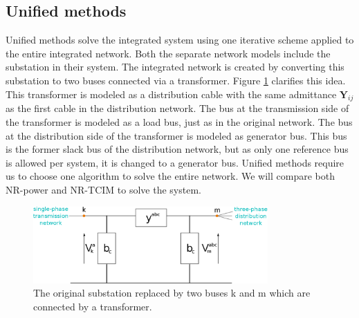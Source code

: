 \documentclass[10pt,journal]{article}
\begin{document}
\subsection{Unified methods}
\noindent Unified methods solve the integrated system using one iterative scheme applied to the entire integrated network. Both the separate network models include the substation in their system. The integrated network is created by converting this substation to two buses connected via a transformer. Figure \ref{fig:subtrans} clarifies this idea. This transformer is modeled as a distribution cable with the same admittance $\mathbf{Y}_{ij}$ as the first cable in the distribution network. The bus at the transmission side of the transformer is modeled as a load bus, just as in the original network. The bus at the distribution side of the transformer is modeled as generator bus. This bus is the former slack bus of the distribution network, but as only one reference bus is allowed per system, it is changed to a generator bus. Unified methods require us to choose one algorithm to solve the entire network. We will compare both NR-power and NR-TCIM to solve the system. \begin{figure}[h]
    \centering
    \includegraphics[width=0.8\textwidth]{Images/substationtransformer.eps}
    \caption{The original substation replaced by two buses k and m which are connected by a transformer.}
    \label{fig:subtrans}
\end{figure}
\end{document}
